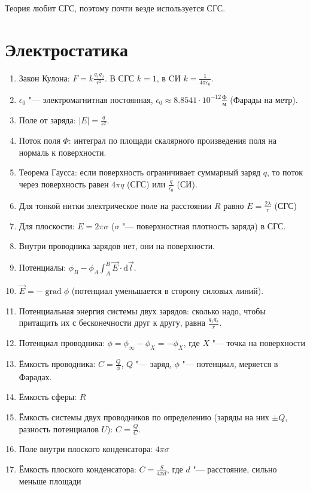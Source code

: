\documentclass[10pt,a4paper]{article}
\renewcommand{\d}{\mathrm{d}}
\DeclareMathOperator{\grad}{grad}
\begin{document}
\rfoot{\today~\currenttime}

Теория любит СГС, поэтому почти везде используется СГС.

\section{Электростатика}
\begin{enumerate}
\item Закон Кулона: $F = k\frac{q_1q_2}{r^2}$. В СГС $k=1$, в CИ $k=\frac{1}{4\pi\epsilon_0}$.
\item $\epsilon_0$ "--- электромагнитная постоянная, $\epsilon_0 \approx 8.8541 \cdot 10^{-12} \frac{Ф}{м}$ (Фарады на метр).
\item Поле от заряда: $|E| = \frac{q}{r^2}$.
\item Поток поля $\Phi$: интеграл по площади скалярного произведения поля на нормаль к поверхности.
\item Теорема Гаусса: если поверхность ограничивает суммарный заряд $q$, то поток через поверхность равен $4\pi q$ (СГС) или $\frac{q}{\epsilon_0}$ (СИ).
\item Для тонкой нитки электрическое поле на расстоянии $R$ равно $E=\frac{2\lambda}{r}$ (СГС)
\item Для плоскости: $E=2\pi \sigma$ ($\sigma$ "--- поверхностная плотность заряда) в СГС.
\item Внутри проводника зарядов нет, они на поверхности.
\item Потенциалы: $\phi_B - \phi_A \int_A^B \vec E \cdot \d \vec l$.
\item $\vec E = -\grad \phi$ (потенциал уменьшается в сторону силовых линий).
\item Потенциальная энергия системы двух зарядов: сколько надо, чтобы притащить их с бесконечности друг к другу, равна $\frac{q_1q_2}{r}$.
\item Потенциал проводника: $\phi = \phi_\infty - \phi_X = -\phi_X$, где $X$ "--- точка на поверхности
\item Ёмкость проводника: $C=\frac{Q}{\phi}$, $Q$ "--- заряд, $\phi$ "--- потенциал, меряется в Фарадах.
\item Ёмкость сферы: $R$
\item Ёмкость системы двух проводников по определению (заряды на них $\pm Q$, разность потенциалов $U$): $C=\frac{Q}{C}$.
\item Поле внутри плоского конденсатора: $4\pi \sigma$
\item Ёмкость плоского конденсатора: $C=\frac{S}{4\pi d}$, где $d$ "--- расстояние, сильно меньше площади

\end{enumerate}
\end{document}
